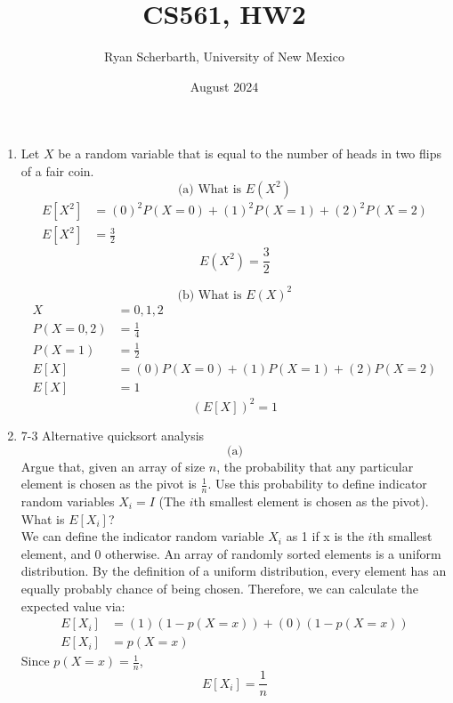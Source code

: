 \documentclass{article}
\title{CS561, HW2}
\author{Ryan Scherbarth, University of New Mexico}
\date{August 2024}
\begin{document}
\maketitle

\begin{enumerate}
\item Let $X$ be a random variable that is equal to the number of heads in two flips of a fair coin.
\newline 
\[
\text{(a) What is } E(X^{2})
\]
\begin{align*}
    E[X^{2}] & = (0)^{2}P(X=0) + (1)^{2}P(X=1) + (2)^{2}P(X=2) \\
    E[X^{2}] & = \frac{3}{2}
\end{align*}
\[
\boxed{E(X^{2}) = \frac{3}{2}}
\]

\[
\text{(b) What is } E(X)^{2}
\]
\begin{align*}
    X & = 0, 1, 2 \\
    P(X=0,2) & = \frac{1}{4} \\
    P(X=1) & = \frac{1}{2} \\
    E[X] & = (0)P(X=0) + (1)P(X=1) + (2)P(X=2) \\
    E[X] & = 1
\end{align*}
\[
\boxed{(E[X])^{2} = 1}
\]








\newpage
\item 7-3 Alternative quicksort analysis
\[
\text{(a)}
\]
Argue that, given an array of size $n$, the probability that any particular element is chosen as the pivot is $\frac{1}{n}$. Use this probability to define indicator random variables $X_i = I$ (The $i$th smallest element is chosen as the pivot). What is $E[X_i]$? \\

We can define the indicator random variable $X_i$ as 1 if x is the $i$th smallest element, and 0 otherwise.
\newline
An array of randomly sorted elements is a uniform distribution. By the definition of a uniform distribution, every element has an equally probably chance of being chosen. 
\newline 
Therefore, we can calculate the expected value via:
\begin{align*}
    E[X_i] & = (1)(1-p(X=x)) + (0)(1-p(X=x)) \\
    E[X_i] & = p(X=x)
\end{align*}
Since $p(X=x) = \frac{1}{n}$, 
\[
\boxed{E[X_i] = \frac{1}{n}}
\]


\end{enumerate}
\end{document}
